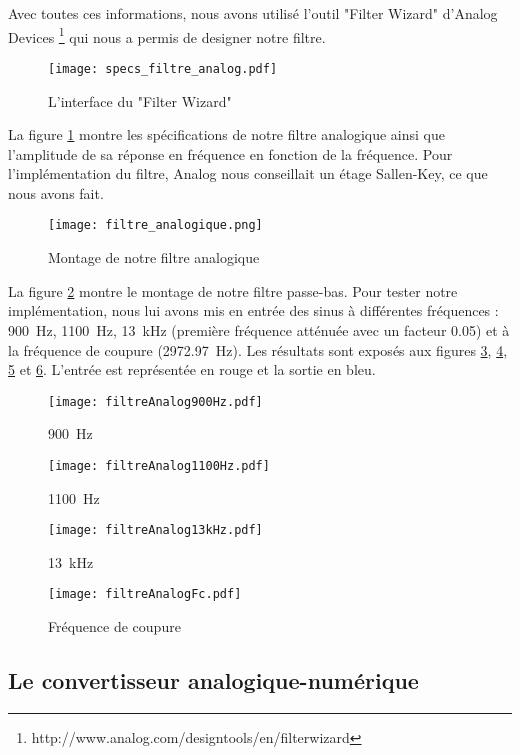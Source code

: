 Avec toutes ces informations, nous avons utilisé l'outil "Filter Wizard" d'Analog Devices \footnote{http://www.analog.com/designtools/en/filterwizard} qui nous a permis de designer notre filtre.
\begin{figure}
\centering
\texttt{[image: specs\_filtre\_analog.pdf]}
\caption{L'interface du "Filter Wizard"}
\label{fig:specsAnalogFilter}
\end{figure}
La figure \ref{fig:specsAnalogFilter} montre les spécifications de notre filtre analogique ainsi que l'amplitude de sa réponse en fréquence en fonction de la fréquence. Pour l'implémentation du filtre, Analog nous conseillait un étage Sallen-Key, ce que nous avons fait.
\begin{figure}
\centering
\texttt{[image: filtre\_analogique.png]}
\caption{Montage de notre filtre analogique}
\label{fig:filtreAnalogique}
\end{figure}
La figure \ref{fig:filtreAnalogique} montre le montage de notre filtre passe-bas. Pour tester notre implémentation, nous lui avons mis en entrée des sinus à différentes fréquences : \SI{900}{\hertz}, \SI{1100}{\hertz}, \SI{13}{\kilo\hertz} (première fréquence atténuée avec un facteur 0.05) et à la fréquence de coupure (\SI{2972.97}{\hertz}). Les résultats sont exposés aux figures \ref{fig:filtreAnalog900Hz}, \ref{fig:filtreAnalog1100Hz}, \ref{fig:filtreAnalog13kHz} et \ref{fig:filtreAnalogFc}. L'entrée est représentée en rouge et la sortie en bleu.
\begin{figure}
\centering
\texttt{[image: filtreAnalog900Hz.pdf]}
\caption{\SI{900}{\hertz}}
\label{fig:filtreAnalog900Hz}
\end{figure}
\begin{figure}
\centering
\texttt{[image: filtreAnalog1100Hz.pdf]}
\caption{\SI{1100}{\hertz}}
\label{fig:filtreAnalog1100Hz}
\end{figure}
\begin{figure}
\centering
\texttt{[image: filtreAnalog13kHz.pdf]}
\caption{\SI{13}{\kilo\hertz}}
\label{fig:filtreAnalog13kHz}
\end{figure}
\begin{figure}
\centering
\texttt{[image: filtreAnalogFc.pdf]}
\caption{Fréquence de coupure}
\label{fig:filtreAnalogFc}
\end{figure}

\subsection{Le convertisseur analogique-numérique}
